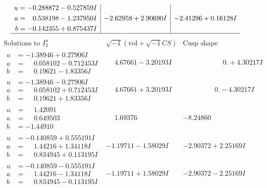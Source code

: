 \documentclass[1p]{elsarticle_modified}
\theoremstyle{definition}
\newcommand{\I}{\sqrt{-1}}
\begin{document}
$$\begin{array}{c|c|c}
\begin{aligned}
u &= -0.288872 - 0.527859 I \\
a &= \phantom{-}0.538198 - 1.237950 I \\
b &= -0.142355 + 0.875437 I\end{aligned}
 & -2.62958 + 2.90690 I & -2.41296 + 0.16128 I\\
 \hline 
 \end{array}$$\newpage$$\begin{array}{c|c|c}  
\text{Solutions to }I^u_{2}& \I (\text{vol} + \sqrt{-1}CS) & \text{Cusp shape}\\
 \hline 
\begin{aligned}
u &= -1.38946 + 0.27906 I \\
a &= \phantom{-}0.058102 - 0.712453 I \\
b &= \phantom{-}0.19621 - 1.83356 I\end{aligned}
 & \phantom{-}4.67661 - 3.20193 I & \phantom{-0.000000 -}0. + 4.30217 I \\ \hline\begin{aligned}
u &= -1.38946 - 0.27906 I \\
a &= \phantom{-}0.058102 + 0.712453 I \\
b &= \phantom{-}0.19621 + 1.83356 I\end{aligned}
 & \phantom{-}4.67661 + 3.20193 I & \phantom{-0.000000 } 0. - 4.30217 I \\ \hline\begin{aligned}
u &= \phantom{-}1.42091\phantom{ +0.000000I} \\
a &= \phantom{-}0.649503\phantom{ +0.000000I} \\
b &= -1.44910\phantom{ +0.000000I}\end{aligned}
 & \phantom{-}1.69376\phantom{ +0.000000I} & -8.24860\phantom{ +0.000000I} \\ \hline\begin{aligned}
u &= -0.140859 + 0.555191 I \\
a &= \phantom{-}1.44216 + 1.34118 I \\
b &= \phantom{-}0.834945 + 0.113195 I\end{aligned}
 & -1.19711 - 1.58029 I & -2.90372 + 2.25169 I \\ \hline\begin{aligned}
u &= -0.140859 - 0.555191 I \\
a &= \phantom{-}1.44216 - 1.34118 I \\
b &= \phantom{-}0.834945 - 0.113195 I\end{aligned}
 & -1.19711 + 1.58029 I & -2.90372 - 2.25169 I \\ \hline\begin{aligned}

\end{aligned}
\end{array}$$
\end{document}
